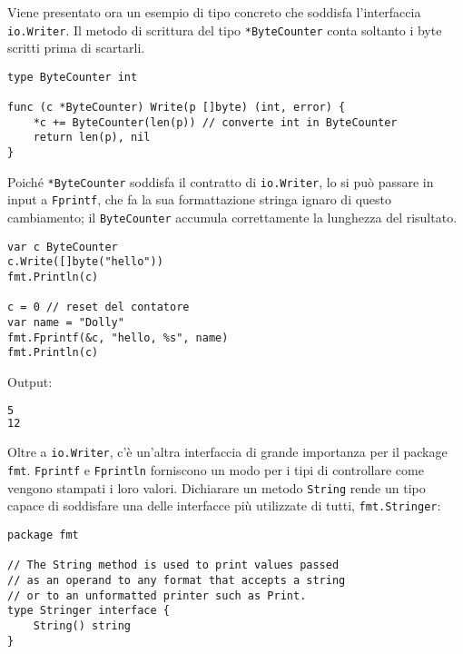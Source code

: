 \documentclass[../../thesis.tex]{subfiles}
\begin{document}
    Viene presentato ora un esempio di tipo concreto che soddisfa l'interfaccia \verb"io.Writer".
    Il metodo di scrittura del tipo \verb"*ByteCounter" conta soltanto i byte scritti prima di scartarli.
    \begin{lstlisting}[frame = single,label={lst:lstlisting6-1.3}]
type ByteCounter int

func (c *ByteCounter) Write(p []byte) (int, error) {
    *c += ByteCounter(len(p)) // converte int in ByteCounter
    return len(p), nil
}
    \end{lstlisting}
    Poiché \verb"*ByteCounter" soddisfa il contratto di \verb"io.Writer", lo si può passare in input a \verb"Fprintf", che fa la sua formattazione stringa ignaro di questo cambiamento;
    il \verb"ByteCounter" accumula correttamente la lunghezza del risultato.
    \begin{lstlisting}[frame = single,label={lst:lstlisting6-1.4}]
var c ByteCounter
c.Write([]byte("hello"))
fmt.Println(c)

c = 0 // reset del contatore
var name = "Dolly"
fmt.Fprintf(&c, "hello, %s", name)
fmt.Println(c)
    \end{lstlisting}
    Output:
    \begin{lstlisting}[language = bash, frame = L,label={lst:lstlisting6-1.5}]
5
12
    \end{lstlisting}
    Oltre a \verb"io.Writer", c'è un'altra interfaccia di grande importanza per il package \verb"fmt". \verb"Fprintf" e \verb"Fprintln" forniscono un modo per i tipi di controllare come vengono stampati i loro valori.
    Dichiarare un metodo \verb"String" rende un tipo capace di soddisfare una delle interfacce più utilizzate di tutti, \verb"fmt.Stringer":
    \begin{lstlisting}[frame = single,label={lst:lstlisting6-1.6}]
package fmt

// The String method is used to print values passed
// as an operand to any format that accepts a string
// or to an unformatted printer such as Print.
type Stringer interface {
    String() string
}
    \end{lstlisting}
\end{document}
